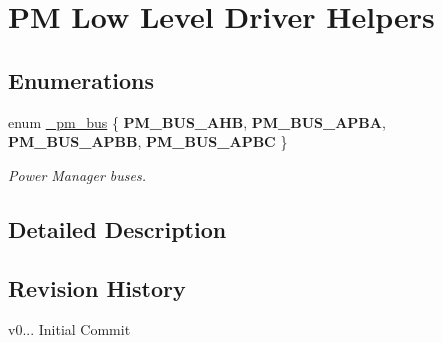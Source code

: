\hypertarget{group__pm__group}{}\section{PM Low Level Driver Helpers}
\label{group__pm__group}
\subsection*{Enumerations}
\begin{DoxyCompactItemize}
\item 
\mbox{\label{group__pm__group_ga3542526c3dc5667e803d6cfea4150796}} 
enum \hyperlink{group__pm__group_ga3542526c3dc5667e803d6cfea4150796}{\+\_\+pm\+\_\+bus} \{ {\bfseries P\+M\+\_\+\+B\+U\+S\+\_\+\+A\+HB}, 
{\bfseries P\+M\+\_\+\+B\+U\+S\+\_\+\+A\+P\+BA}, 
{\bfseries P\+M\+\_\+\+B\+U\+S\+\_\+\+A\+P\+BB}, 
{\bfseries P\+M\+\_\+\+B\+U\+S\+\_\+\+A\+P\+BC}
 \}\begin{DoxyCompactList}\small\item\em Power Manager buses. \end{DoxyCompactList}
\end{DoxyCompactItemize}


\subsection{Detailed Description}
\hypertarget{group__pm__group_pm_helpers_rev}{}\subsection{Revision History}\label{group__pm__group_pm_helpers_rev}

\begin{DoxyItemize}
\item v0... Initial Commit 
\end{DoxyItemize}